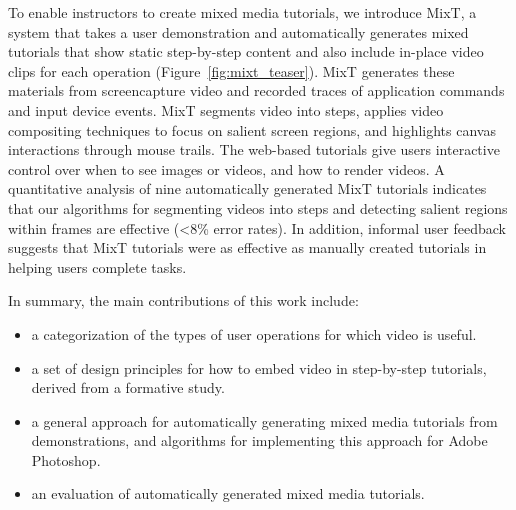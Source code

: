 To enable instructors to create mixed media tutorials, we introduce MixT, a system that takes a user demonstration and automatically generates mixed tutorials that show static step-by-step content and also include in-place video clips for each operation (Figure~\ref{fig:mixt_teaser}). MixT generates these materials from screencapture video and recorded traces of application commands and input device events. MixT segments video into steps, applies video compositing techniques to focus on salient screen regions, and highlights canvas interactions through mouse trails. The web-based tutorials give users interactive control over when to see images or videos, and how to render videos. A quantitative analysis of nine automatically generated MixT tutorials indicates that our algorithms for segmenting videos into steps and detecting salient regions within frames are effective ({\textless}8\% error rates). In addition, informal user feedback suggests that MixT tutorials were as effective as manually created tutorials in helping users complete tasks.

In summary, the main contributions of this work include:

\begin{itemize}
  \item a categorization of the types of user operations for which video is useful.
  \item a set of design principles for how to embed video in step-by-step tutorials, derived from a formative study.
  \item a general approach for automatically generating mixed media tutorials from demonstrations, and algorithms for implementing this approach for Adobe Photoshop.
  \item an evaluation of automatically generated mixed media tutorials.
\end{itemize}
